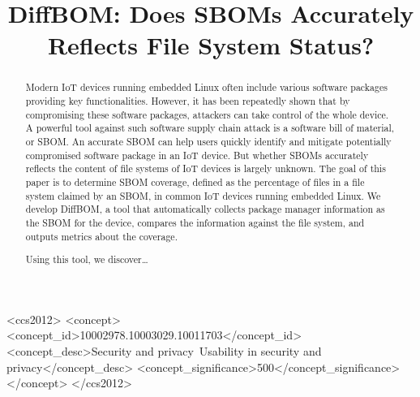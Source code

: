 \documentclass[sigconf, anonymous]{acmart}
\begin{document}
\title{DiffBOM: Does SBOMs Accurately Reflects File System Status?} %

\begin{abstract}
Modern IoT devices running embedded Linux often include various software packages providing key functionalities. However, it has been repeatedly shown that by compromising these software packages, attackers can take control of the whole device. A powerful tool against such software supply chain attack is a software bill of material, or SBOM. An accurate SBOM can help users quickly identify and mitigate potentially compromised software package in an IoT device. But whether SBOMs accurately reflects the content of file systems of IoT devices is largely unknown. The goal of this paper is to determine SBOM coverage, defined as the percentage of files in a file system claimed by an SBOM, in common IoT devices running embedded Linux. We develop DiffBOM, a tool that automatically collects package manager information as the SBOM for the device, compares the information against the file system, and outputs metrics about the coverage.\par
Using this tool, we discover…
\end{abstract}

\begin{CCSXML}
<ccs2012>
<concept>
<concept_id>10002978.10003029.10011703</concept_id>
<concept_desc>Security and privacy~Usability in security and privacy</concept_desc>
<concept_significance>500</concept_significance>
</concept>
</ccs2012>
\end{CCSXML}



\maketitle




\end{document}
